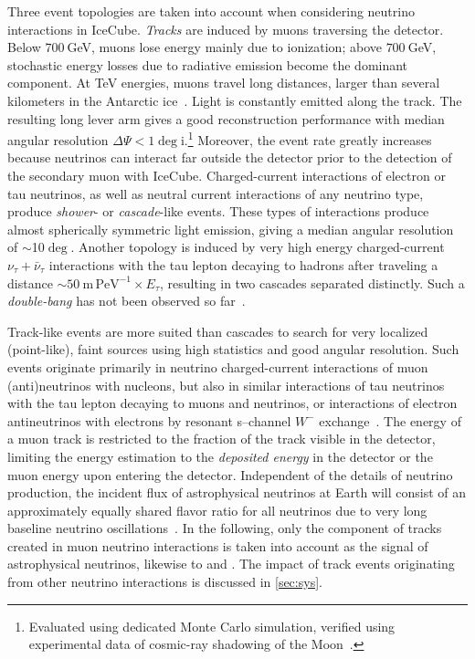\documentclass[aps,10pt,prd,twocolumn,floats,letterpaper,showpacs,nofootinbib,bibnotes,notitlepage,superscriptaddress]{revtex4-1}
\begin{document}
Three event topologies are taken
into account when considering neutrino interactions in IceCube. \emph{Tracks}
are induced by muons traversing the detector. Below $700\:$GeV, muons lose
energy mainly due to ionization; above $700\:$GeV, stochastic energy losses due
to radiative emission become the dominant component. At TeV energies, muons
travel long distances, larger than several kilometers in the Antarctic
ice~\citep{Chirkin:2004hz}. Light is constantly emitted along the track. The
resulting long lever arm gives a good reconstruction performance with median
angular resolution $\Delta\Psi<1\deg$i.\footnote{Evaluated using dedicated Monte
Carlo simulation, verified using experimental data of cosmic-ray shadowing of
the Moon~\citep{Aartsen:2013zka}.} Moreover, the event rate greatly increases
because neutrinos can interact far outside the detector prior to the detection
of the secondary muon with IceCube.  Charged-current interactions of electron
or tau neutrinos, as well as neutral current interactions of any neutrino type,
produce \emph{shower}- or \emph{cascade}-like events. These types of
interactions produce almost spherically symmetric light emission, giving a
median angular resolution of $\sim$10$\deg$. Another topology is induced by
very high energy charged-current $\nu_\tau+\bar{\nu}_\tau$ interactions with
the tau lepton decaying to hadrons after traveling a distance
$\sim50\:\mathrm{m\,PeV}^{-1}\times E_\tau$, resulting in two cascades separated
distinctly. Such a \emph{double-bang} has not been observed so
far~\citep{Aartsen:2015dlt}.

Track-like events are more suited than cascades to search for very localized
(point-like), faint sources using high statistics and good angular resolution.
Such events originate primarily in neutrino charged-current interactions
of muon (anti)neutrinos with nucleons, but also in similar interactions of tau
neutrinos with the tau lepton decaying to muons and neutrinos, or
interactions of electron antineutrinos with electrons by resonant s--channel
$W^-$ exchange~\citep[Glashow Resonance;][]{Glashow:1960zz}. The energy of
a muon track is restricted to the fraction of the track visible in the
detector, limiting the energy estimation to the \emph{deposited energy} in
the detector or the muon energy upon entering the detector. Independent of the
details of neutrino production, the incident flux of astrophysical neutrinos at
Earth will consist of an approximately equally shared flavor ratio for all
neutrinos due to very long baseline neutrino oscillations~\citep{Athar:2005wg}.
In the following, only the component of tracks created in muon neutrino
interactions is taken into account as the signal of astrophysical neutrinos,
likewise to \cite{Aartsen:2014cva} and \cite{Adrian-Martinez:2014wzf}. The
impact of track events originating from other neutrino interactions is
discussed in \ref{sec:sys}.
\end{document}
